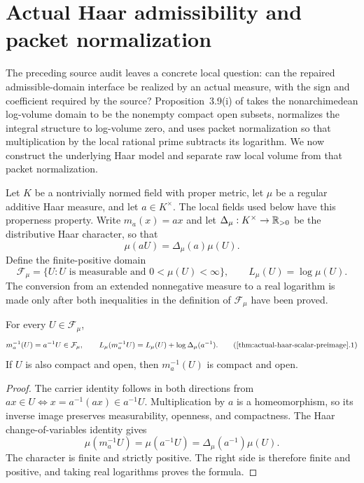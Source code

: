 \section{Actual Haar admissibility and packet normalization}
\label{sec:iut-actual-haar-admissible-orbit}

The preceding source audit leaves a concrete local question: can the repaired
admissible-domain interface be realized by an actual measure, with the sign
and coefficient required by the source?  Proposition~3.9(i) of
\cite{IUT3} takes the nonarchimedean log-volume domain to be the nonempty
compact open subsets, normalizes the integral structure to log-volume zero,
and uses packet normalization so that multiplication by the local rational
prime subtracts its logarithm.  We now construct the underlying Haar model
and separate raw local volume from that packet normalization.

Let $K$ be a nontrivially normed field with proper metric, let $\mu$ be a
regular additive Haar measure, and let $a\in K^\times$.  The local fields
used below have this properness property.  Write
$m_a(x)=ax$ and let $\Delta_\mu:K^\times\to\mathbb R_{>0}$ be the distributive
Haar character, so that
\[
                 \mu(aU)=\Delta_\mu(a)\mu(U).
\]
Define the finite-positive domain
\[
 \mathcal F_\mu=
 \{U:U\text{ is measurable and }0<\mu(U)<\infty\},
 \qquad L_\mu(U)=\log\mu(U).
\]
The conversion from an extended nonnegative measure to a real logarithm is
made only after both inequalities in the definition of $\mathcal F_\mu$ have
been proved.

\begin{theorem}
\label{thm:actual-haar-scalar-preimage}
For every $U\in\mathcal F_\mu$,
\[
 m_a^{-1}(U)=a^{-1}U\in\mathcal F_\mu,
 \qquad
 L_\mu(m_a^{-1}U)
 =L_\mu(U)+\log\Delta_\mu(a^{-1}).
 \tag{\ref{thm:actual-haar-scalar-preimage}.1}
\]
If $U$ is also compact and open, then $m_a^{-1}(U)$ is compact and open.
\end{theorem}

\begin{proof}
The carrier identity follows in both directions from
$ax\in U\Longleftrightarrow x=a^{-1}(ax)\in a^{-1}U$.  Multiplication by
$a$ is a homeomorphism, so its inverse image preserves measurability,
openness, and compactness.  The Haar change-of-variables identity gives
\[
 \mu(m_a^{-1}U)=\mu(a^{-1}U)
 =\Delta_\mu(a^{-1})\mu(U).
\]
The character is finite and strictly positive.  The right side is therefore
finite and positive, and taking real logarithms proves the formula.
\end{proof}

